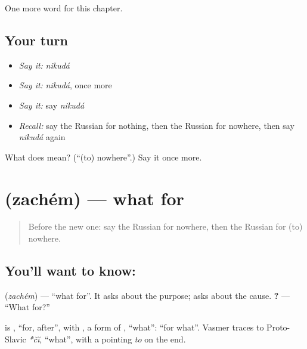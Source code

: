 \begin{grammarlens}[title={What you've built}]
One more word for this chapter.
\end{grammarlens}

\subsection*{Your turn}
\begin{itemize}
\raggedright
  \item \emph{Say it:} \emph{nikudá}
  \item \emph{Say it:} \emph{nikudá}, once more
  \item \emph{Say it:} say \emph{nikudá}
  \item \emph{Recall:} say the Russian for nothing, then the Russian for nowhere, then say \emph{nikudá} again
\end{itemize}

\begin{tcolorbox}[breakable,colback=teal!4,colframe=teal!35!black,title={Before you move on}]
What does  mean? (\textquotedblleft{}(to) nowhere\textquotedblright{}.) Say it once more.
\end{tcolorbox}
\section[\texorpdfstring{\ru{зачем} (zachém)}{зачем (zachém)}]{ (zachém) — what for}

\label{lesson:RU-C136-zachem}



\begin{quote}
Before the new one: say the Russian for nowhere, then the Russian for (to) nowhere.
\end{quote}

\subsection*{You'll want to know: }
\textbf{} (\emph{zachém}) — \textquotedblleft{}what for\textquotedblright{}. It asks about the purpose; \textbf{} asks about the cause. \textbf{?} — \textquotedblleft{}What for?\textquotedblright{}

\begin{cousinweb}
\textbf{} is \emph{}, \textquotedblleft{}for, after\textquotedblright{}, with \emph{}, a form of \emph{}, \textquotedblleft{}what\textquotedblright{}: \textquotedblleft{}for what\textquotedblright{}. Vasmer traces \emph{} to Proto-Slavic \emph{*čĭ}, \textquotedblleft{}what\textquotedblright{}, with a pointing \emph{to} on the end.
\end{cousinweb}

